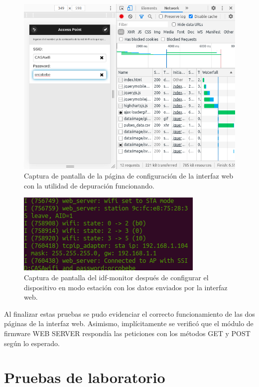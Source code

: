 \begin{figure}[ht]
	\centering
	\includegraphics[scale=0.5]{./Figures/test_interface_form.png}
	\caption{Captura de pantalla de la página de configuración de la interfaz web con la utilidad de depuración funcionando.}
	\label{fig:testScreenWifiConf}
\end{figure}

\begin{figure}[ht]
	\centering
	\includegraphics[scale=0.55]{./Figures/test_interface_idf.png}
	\caption{Captura de pantalla del idf-monitor después de configurar el dispositivo en modo estación con los datos enviados por la interfaz web.}
	\label{fig:testScreenIDFTransfer2}
\end{figure}

Al finalizar estas pruebas se pudo evidenciar el correcto funcionamiento de las dos páginas de la interfaz web. Asimismo, implícitamente se verificó que el módulo de firmware WEB SERVER respondía las peticiones con los métodos GET y POST según lo esperado.

\section{Pruebas de laboratorio}

